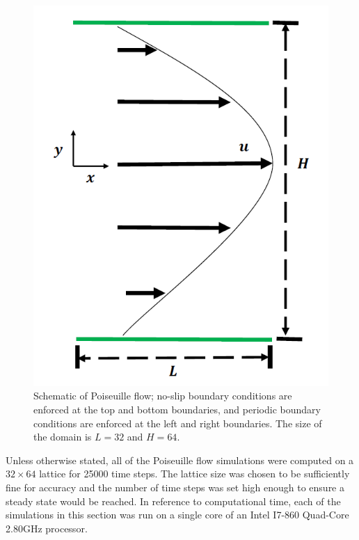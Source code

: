 \begin{figure}
	\centering
    \includegraphics[width=\linewidth]{figs/poise-schematic}
    \caption{Schematic of Poiseuille flow; no-slip boundary conditions are enforced at the top and bottom boundaries, and periodic boundary conditions are enforced at the left and right boundaries.
The size of the domain is $L = 32$  and $H = 64$.}
    \label{fig:poise-schematic}
\end{figure}

Unless otherwise stated, all of the Poiseuille flow simulations were computed on a $32 \times 64$ lattice for 25000 time steps.
The lattice size was chosen to be sufficiently fine for accuracy and the number of time steps was set high enough to ensure a steady state would be reached.
In reference to computational time, each of the simulations in this section was run on a single core of an Intel I7-860 Quad-Core 2.80GHz processor.

